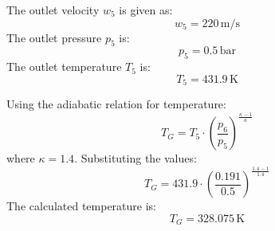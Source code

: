 The outlet velocity \( w_5 \) is given as:  
\[
w_5 = 220 \, \text{m/s}
\]  
The outlet pressure \( p_5 \) is:  
\[
p_5 = 0.5 \, \text{bar}
\]  
The outlet temperature \( T_5 \) is:  
\[
T_5 = 431.9 \, \text{K}
\]  

Using the adiabatic relation for temperature:  
\[
T_G = T_5 \cdot \left( \frac{p_6}{p_5} \right)^{\frac{\kappa - 1}{\kappa}}
\]  
where \( \kappa = 1.4 \). Substituting the values:  
\[
T_G = 431.9 \cdot \left( \frac{0.191}{0.5} \right)^{\frac{1.4 - 1}{1.4}}
\]  
The calculated temperature is:  
\[
T_G = 328.075 \, \text{K}
\]